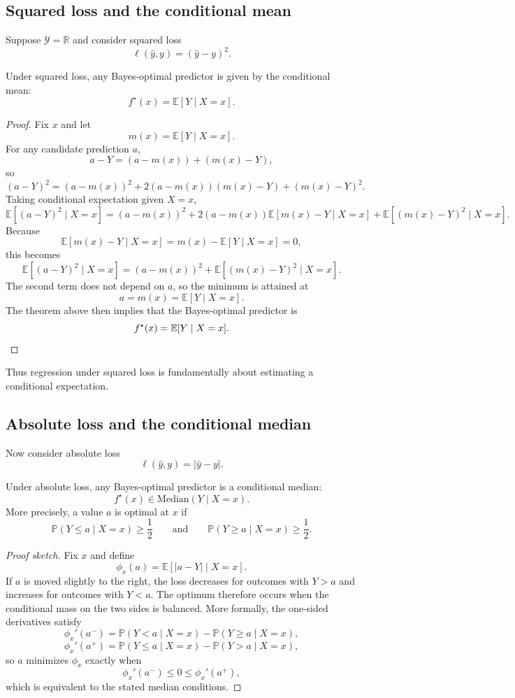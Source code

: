 \subsection*{Squared loss and the conditional mean}

Suppose $\mathcal Y=\mathbb R$ and consider squared loss
\[
\ell(\hat y,y)=(\hat y-y)^2.
\]

\begin{proposition}
Under squared loss, any Bayes-optimal predictor is given by the conditional mean:
\[
f^\star(x)=\mathbb E[Y\mid X=x].
\]
\end{proposition}

\begin{proof}
Fix $x$ and let
\[
m(x)=\mathbb E[Y\mid X=x].
\]
For any candidate prediction $a$,
\[
a-Y=(a-m(x))+(m(x)-Y),
\]
so
\[
(a-Y)^2
=
(a-m(x))^2
+
2(a-m(x))(m(x)-Y)
+
(m(x)-Y)^2.
\]
Taking conditional expectation given $X=x$,
\[
\mathbb E[(a-Y)^2\mid X=x]
=
(a-m(x))^2
+
2(a-m(x))\mathbb E[m(x)-Y\mid X=x]
+
\mathbb E[(m(x)-Y)^2\mid X=x].
\]
Because
\[
\mathbb E[m(x)-Y\mid X=x]
=
m(x)-\mathbb E[Y\mid X=x]
=
0,
\]
this becomes
\[
\mathbb E[(a-Y)^2\mid X=x]
=
(a-m(x))^2+\mathbb E[(m(x)-Y)^2\mid X=x].
\]
The second term does not depend on $a$, so the minimum is attained at
\[
a=m(x)=\mathbb E[Y\mid X=x].
\]
The theorem above then implies that the Bayes-optimal predictor is
\[
f^\star(x)=\mathbb E[Y\mid X=x].
\qedhere
\]
\end{proof}

Thus regression under squared loss is fundamentally about estimating a conditional expectation.

\subsection*{Absolute loss and the conditional median}

Now consider absolute loss
\[
\ell(\hat y,y)=|\hat y-y|.
\]

\begin{proposition}
Under absolute loss, any Bayes-optimal predictor is a conditional median:
\[
f^\star(x)\in \mathrm{Median}(Y\mid X=x).
\]
More precisely, a value $a$ is optimal at $x$ if
\[
\mathbb P(Y\le a\mid X=x)\ge \frac12
\qquad\text{and}\qquad
\mathbb P(Y\ge a\mid X=x)\ge \frac12.
\]
\end{proposition}

\begin{proof}[Proof sketch]
Fix $x$ and define
\[
\phi_x(a)=\mathbb E[|a-Y|\mid X=x].
\]
If $a$ is moved slightly to the right, the loss decreases for outcomes with $Y>a$ and increases for outcomes with $Y<a$. The optimum therefore occurs when the conditional mass on the two sides is balanced. More formally, the one-sided derivatives satisfy
\[
\phi_x'(a^-)=\mathbb P(Y<a\mid X=x)-\mathbb P(Y\ge a\mid X=x),
\]
\[
\phi_x'(a^+)=\mathbb P(Y\le a\mid X=x)-\mathbb P(Y>a\mid X=x),
\]
so $a$ minimizes $\phi_x$ exactly when
\[
\phi_x'(a^-)\le 0 \le \phi_x'(a^+),
\]
which is equivalent to the stated median conditions.
\end{proof}

